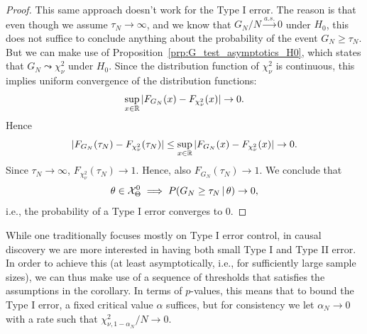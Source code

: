 \begin{proof}
This same approach doesn't work for the Type I error. The reason is that even though
we assume $\tau_N \to \infty$, and we know that $G_N / N \stackrel{a.s.}{\to} 0$ 
under $H_0$,
this does not suffice to conclude anything about the probability of the event 
$G_N \ge \tau_N$. But we can make use of Proposition~\ref{prp:G_test_asymptotics_H0},
which states that $G_N \leadsto \chi_{\nu}^2$ under $H_0$. 
Since the distribution function of $\chi_{\nu}^2$ is continuous,
this implies uniform convergence of the distribution functions:
  $$\sup_{x \in \mathbb{R}} |F_{G_N}(x) - F_{\chi_{\nu}^2}(x)| \to 0.$$
Hence
  $$|F_{G_N}(\tau_N) - F_{\chi_{\nu}^2}(\tau_N)| \le \sup_{x\in\mathbb{R}} |F_{G_N}(x) - F_{\chi_{\nu}^2}(x)| \to 0.$$
Since $\tau_N \to \infty$, $F_{\chi_{\nu}^2}(\tau_N) \to 1$.
Hence, also $F_{G_N}(\tau_N) \to 1$.
We conclude that 
  $$\theta \in \mathcal{X}_\Theta^0 \implies P(G_N \ge \tau_N \operatorname*{|} \theta) \to 0,$$
i.e., the probability of a Type I error converges to 0.
\end{proof}

While one traditionally focuses mostly on Type I error control, in causal discovery we
are more interested in having both small Type I and Type II error. In order to achieve this
(at least asymptotically, i.e., for sufficiently large sample sizes), we can thus make use of a sequence of
thresholds that satisfies the assumptions in the corollary. In terms of $p$-values, this means
that to bound the Type I error, a fixed critical value $\alpha$ suffices, but for consistency we
let $\alpha_N \to 0$ with a rate such that $\chi^2_{\nu,1-\alpha_N} / N \to 0$.

